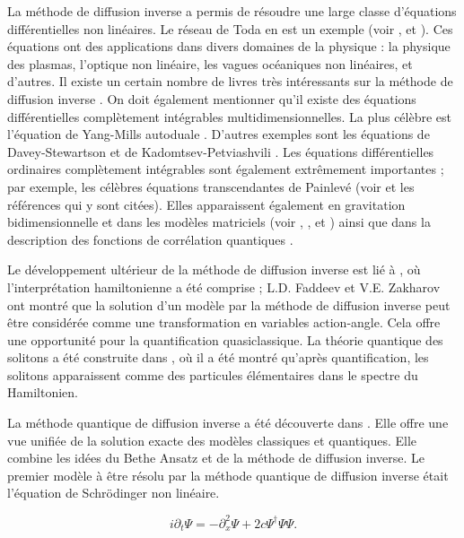 La méthode de diffusion inverse a permis de résoudre une large classe d'équations différentielles non linéaires. Le réseau de Toda en est un exemple (voir \cite{??}, \cite{??} et \cite{??}). Ces équations ont des applications dans divers domaines de la physique : la physique des plasmas, l'optique non linéaire, les vagues océaniques non linéaires, et d'autres. Il existe un certain nombre de livres très intéressants sur la méthode de diffusion inverse \cite{??, ??, ??, ??, ??, ??, ??, ??}. On doit également mentionner qu'il existe des équations différentielles complètement intégrables multidimensionnelles. La plus célèbre est l'équation de Yang-Mills autoduale \cite{??}. D'autres exemples sont les équations de Davey-Stewartson \cite{??} et de Kadomtsev-Petviashvili \cite{??}. Les équations différentielles ordinaires complètement intégrables sont également extrêmement importantes ; par exemple, les célèbres équations transcendantes de Painlevé (voir \cite{??} et les références qui y sont citées). Elles apparaissent également en gravitation bidimensionnelle et dans les modèles matriciels (voir \cite{??}, \cite{??}, et \cite{??}) ainsi que dans la description des fonctions de corrélation quantiques \cite{??, ??, ?? et ??}.

Le développement ultérieur de la méthode de diffusion inverse est lié à \cite{??}, où l'interprétation hamiltonienne a été comprise ; L.D. Faddeev et V.E. Zakharov ont montré que la solution d'un modèle par la méthode de diffusion inverse peut être considérée comme une transformation en variables action-angle. Cela offre une opportunité pour la quantification quasiclassique. La théorie quantique des solitons a été construite dans \cite{??, ??, ??, et ??}, où il a été montré qu'après quantification, les solitons apparaissent comme des particules élémentaires dans le spectre du Hamiltonien.

La méthode quantique de diffusion inverse a été découverte dans \cite{??}. Elle offre une vue unifiée de la solution exacte des modèles classiques et quantiques. Elle combine les idées du Bethe Ansatz et de la méthode de diffusion inverse. Le premier modèle à être résolu par la méthode quantique de diffusion inverse était l'équation de Schrödinger non linéaire.


$$i\partial_t \Psi = -\partial_x^2 \Psi + 2c \Psi^\dag \Psi \Psi .$$


